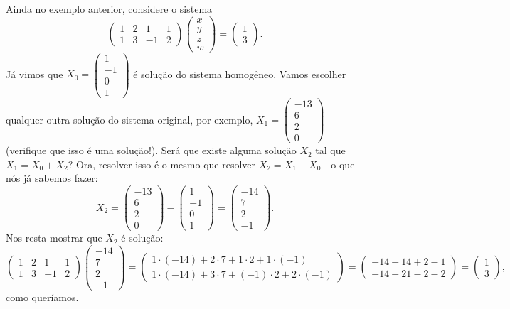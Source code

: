 \begin{ex}
	Ainda no exemplo anterior, considere o sistema
	\[\begin{pmatrix}
	1 & 2 & 1 & 1\\1&3&-1&2
	\end{pmatrix}\begin{pmatrix}
	x\\y\\z\\w
	\end{pmatrix}=\begin{pmatrix}
	1\\3
	\end{pmatrix}.\] Já vimos que $X_0=\begin{pmatrix}
	1\\-1\\0\\1
	\end{pmatrix}$ é solução do sistema homogêneo. Vamos escolher qualquer outra solução do sistema original, por exemplo, $X_1=\begin{pmatrix}
	-13\\6\\2\\0
	\end{pmatrix}$ (verifique que isso é uma solução!). Será que existe alguma solução $X_2$ tal que $X_1=X_0+X_2$? Ora, resolver isso é o mesmo que resolver $X_2=X_1-X_0$ - o que nós já sabemos fazer:
	\[X_2=\begin{pmatrix}
	-13\\6\\2\\0
	\end{pmatrix}-\begin{pmatrix}
	1\\-1\\0\\1
	\end{pmatrix}=\begin{pmatrix}
	-14\\7\\2\\-1
	\end{pmatrix}.\] Nos resta mostrar que $X_2$ é solução:
	\[\begin{pmatrix}
	1 & 2 & 1 & 1\\1&3&-1&2
	\end{pmatrix}\begin{pmatrix}
	-14\\7\\2\\-1
	\end{pmatrix}=\begin{pmatrix}
	1\cdot(-14)+2\cdot 7+1\cdot2+1\cdot(-1)\\
	1\cdot(-14)+3\cdot7+(-1)\cdot2+2\cdot(-1)
	\end{pmatrix}=\begin{pmatrix}
	-14+14+2-1\\-14+21-2-2
	\end{pmatrix}=\begin{pmatrix}
	1\\3
	\end{pmatrix},\]como queríamos.
\end{ex}

